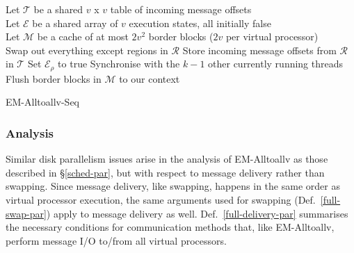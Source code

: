 \documentclass[12pt]{carletoncsthesis}
\begin{document}
\begin{algorithm}[ht]
\BlankLine
Let $\mathcal{T}$ be a shared $v$ x $v$ table of incoming message offsets\\
Let $\mathcal{E}$ be a shared array of $v$ execution states, all initially false\\
Let $\mathcal{M}$ be a cache of at most $2v^2$ border blocks ($2v$ per virtual processor)\\
\BlankLine
{}
	Swap out everything except regions in $\mathcal{R}$\;
	Store incoming message offsets from $\mathcal{R}$ in $\mathcal{T}$
		\;
	Set $\mathcal{E}_\rho$ to true\;
	Synchronise with the $k - 1$ other currently running threads\;
\BlankLine{}
\BlankLine{}
\BlankLine
{}
\BlankLine{}
\BlankLine
{}
	Flush border blocks in $\mathcal{M}$ to our context\;
\BlankLine{}\BlankLine
\caption{{\sc EM-Alltoallv-Seq}}
\label{alltoall-direct-seq}
\end{algorithm}

\clearpage
\subsubsection{Analysis}


Similar disk parallelism issues arise in the analysis of {\sc EM-Alltoallv}
as those described in \S\ref{sched-par}, but with respect to message delivery
rather than swapping.  Since message delivery, like swapping, happens in
the same order as virtual processor execution, the same arguments used for
swapping (Def.~\ref{full-swap-par}) apply to message delivery as well.
Def.~\ref{full-delivery-par} summarises the necessary conditions for
communication methods that, like {\sc EM-Alltoallv}, perform message I/O
to/from all virtual processors.
\end{document}
